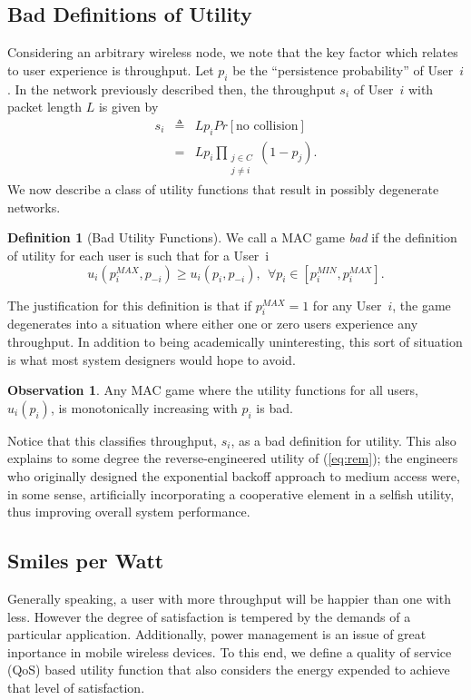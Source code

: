 \documentclass[conference]{IEEEtran}
\theoremstyle{definition}
\newtheorem{definition}{Definition}
\newtheorem{observation}{Observation}
\begin{document}
\subsection{Bad Definitions of Utility}
Considering an arbitrary wireless node, we note that the key factor which relates to user experience is throughput. Let $p_i$ be the ``persistence probability'' of User~$i$. In the network previously described then, the throughput $s_i$ of User~$i$ with packet length $L$ is given by
\begin{eqnarray}
	s_i & \triangleq & L p_i Pr[\text{no collision}] \nonumber \\
		& = & L p_i \prod_{\substack{j \in C\\j \neq i}} (1-p_j). \label{eq:thru}
\end{eqnarray}
We now describe a class of utility functions that result in possibly degenerate networks. 
\begin{definition}[Bad Utility Functions]
	We call a MAC game {\em bad} if the definition of utility for each user is such that for a User~i
	\begin{equation}
		u_i(p_i^{MAX},p_{-i}) \geq u_i(p_i,p_{-i}), \ \ \forall p_i\in[p_i^{MIN},p_i^{MAX}].
	\end{equation}
\end{definition}

The justification for this definition is that if $p_i^{MAX} = 1$ for any User~$i$, the game degenerates into a situation where either one or zero users experience any throughput. In addition to being academically uninteresting, this sort of situation is what most system designers would hope to avoid. 
\begin{observation}
	Any MAC game where the utility functions for all users, $u_i(p_i)$, is monotonically increasing with $p_i$ is bad.
\end{observation}
Notice that this classifies throughput, $s_i$, as a bad definition for utility. This also explains to some degree the reverse-engineered utility of (\ref{eq:rem}); the engineers who originally designed the exponential backoff approach to medium access were, in some sense, artificially incorporating a cooperative element in a selfish utility, thus improving overall system performance.

\subsection{Smiles per Watt}
Generally speaking, a user with more throughput will be happier than one with less. However the degree of satisfaction is tempered by the demands of a particular application. Additionally, power management is an issue of great inportance in mobile wireless devices. To this end, we define a quality of service (QoS) based utility function that also considers the energy expended to achieve that level of satisfaction.
\end{document}
